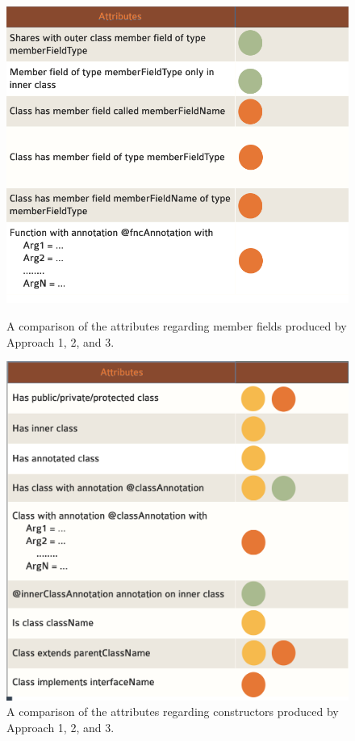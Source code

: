 \documentclass[12pt]{article}
\begin{document}
\begin{figure}
\centering
\parbox{7.5 cm}{
\includegraphics[width=\linewidth]{attributeFields.png}
\caption{A comparison of the attributes regarding member fields produced by Approach 1, 2, and 3.}
\label{fig:attrField}}
\qquad
\begin{minipage}{8 cm}
\includegraphics[width=\linewidth]{attributeClass.png}
\caption{A comparison of the attributes regarding constructors produced by Approach 1, 2, and 3.}
\label{fig:attrClass}
\end{minipage}
\end{figure}
\end{document}
